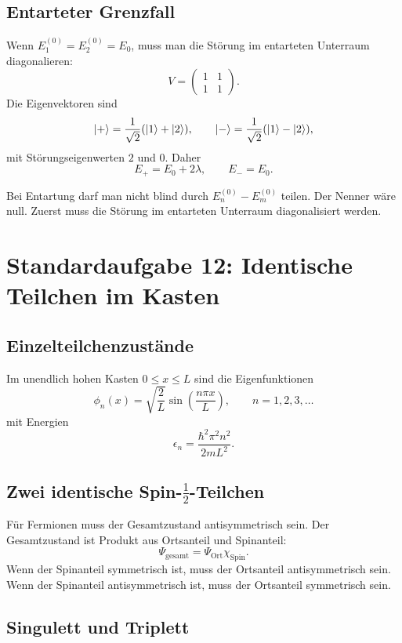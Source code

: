 \subsection{Entarteter Grenzfall}

Wenn $E_1^{(0)}=E_2^{(0)}=E_0$, muss man die Störung im entarteten Unterraum diagonalieren:
\[
    V=\begin{pmatrix}1&1\\1&1\end{pmatrix}.
\]
Die Eigenvektoren sind
\[
    \left|+\right\rangle=\frac{1}{\sqrt2}(\left|1\right\rangle+\left|2\right\rangle),
    \qquad
    \left|-\right\rangle=\frac{1}{\sqrt2}(\left|1\right\rangle-\left|2\right\rangle),
\]
mit Störungseigenwerten $2$ und $0$. Daher
\[
    E_+=E_0+2\lambda,
    \qquad
    E_-=E_0.
\]

\begin{examtipbox}
Bei Entartung darf man nicht blind durch $E_n^{(0)}-E_m^{(0)}$ teilen. Der Nenner wäre null. Zuerst muss die Störung im entarteten Unterraum diagonalisiert werden.
\end{examtipbox}

\section{Standardaufgabe 12: Identische Teilchen im Kasten}

\subsection{Einzelteilchenzustände}

Im unendlich hohen Kasten $0\leq x\leq L$ sind die Eigenfunktionen
\[
    \phi_n(x)=\sqrt{\frac{2}{L}}\sin\left(\frac{n\pi x}{L}\right),
    \qquad
    n=1,2,3,\dots
\]
mit Energien
\[
    \epsilon_n=\frac{\hbar^2\pi^2n^2}{2mL^2}.
\]

\subsection{Zwei identische Spin-$\frac12$-Teilchen}

Für Fermionen muss der Gesamtzustand antisymmetrisch sein. Der Gesamtzustand ist Produkt aus Ortsanteil und Spinanteil:
\[
    \Psi_{\text{gesamt}}=\Psi_{\text{Ort}}\chi_{\text{Spin}}.
\]
Wenn der Spinanteil symmetrisch ist, muss der Ortsanteil antisymmetrisch sein. Wenn der Spinanteil antisymmetrisch ist, muss der Ortsanteil symmetrisch sein.

\subsection{Singulett und Triplett}


